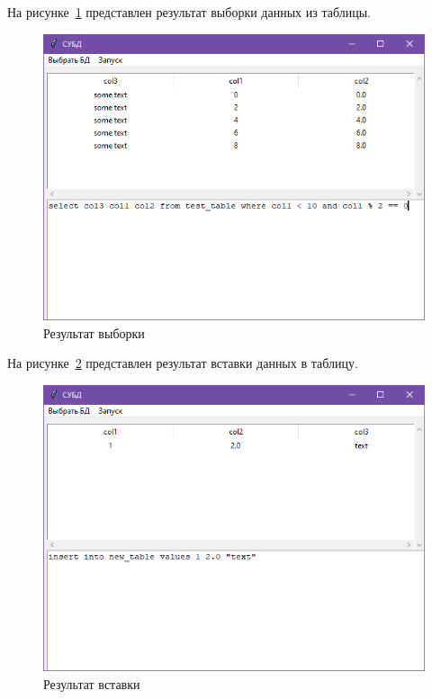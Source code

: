 На рисунке~\ref{fig:select_sql} представлен результат выборки данных из таблицы.
\begin{figure}[H]
	\centering
	\includegraphics[width=0.9\linewidth]{"images/выборка"}
	\caption{Результат выборки}
	\label{fig:select_sql}
\end{figure}

На рисунке~\ref{fig:insert_sql} представлен результат вставки данных в таблицу.
\begin{figure}[H]
	\centering
	\includegraphics[width=0.9\linewidth]{"images/вставка"}
	\caption{Результат вставки}
	\label{fig:insert_sql}
\end{figure}

